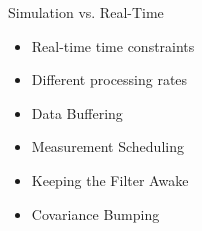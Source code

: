 \begin{frame}
Simulation vs. Real-Time
 \begin{itemize}
 \item Real-time time constraints
 \item Different processing rates
 \item Data Buffering
 \item Measurement Scheduling
 \item Keeping the Filter Awake
 \item Covariance Bumping
\end{itemize}
\end{frame}






